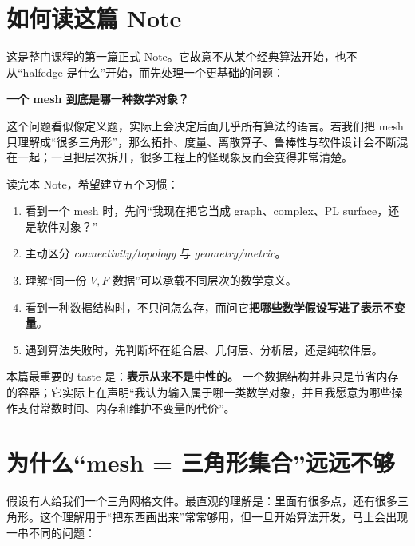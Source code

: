 \documentclass[UTF8,11pt]{ctexart}
\title{\notetitle}
\author{Mesh 深度学习课程 · M00-N01}
\date{版本 \noteversion\quad 状态：\notestatus\quad 更新：\notelastupdate}
\begin{document}
\maketitle
\tableofcontents

\section*{如何读这篇 Note}

这是整门课程的第一篇正式 Note。它故意不从某个经典算法开始，也不从“halfedge 是什么”开始，而先处理一个更基础的问题：

\begin{center}
\Large\bfseries 一个 mesh 到底是哪一种数学对象？
\end{center}

这个问题看似像定义题，实际上会决定后面几乎所有算法的语言。若我们把 mesh 只理解成“很多三角形”，那么拓扑、度量、离散算子、鲁棒性与软件设计会不断混在一起；一旦把层次拆开，很多工程上的怪现象反而会变得非常清楚。

读完本 Note，希望建立五个习惯：

\begin{enumerate}
  \item 看到一个 mesh 时，先问“我现在把它当成 graph、complex、PL surface，还是软件对象？”
  \item 主动区分 \emph{connectivity/topology} 与 \emph{geometry/metric}。
  \item 理解“同一份 $V,F$ 数据”可以承载不同层次的数学意义。
  \item 看到一种数据结构时，不只问怎么存，而问它\textbf{把哪些数学假设写进了表示不变量}。
  \item 遇到算法失败时，先判断坏在组合层、几何层、分析层，还是纯软件层。
\end{enumerate}

\begin{keyidea}
本篇最重要的 taste 是：\textbf{表示从来不是中性的。} 一个数据结构并非只是节省内存的容器；它实际上在声明“我认为输入属于哪一类数学对象，并且我愿意为哪些操作支付常数时间、内存和维护不变量的代价”。
\end{keyidea}

\section{为什么“mesh = 三角形集合”远远不够}

假设有人给我们一个三角网格文件。最直观的理解是：里面有很多点，还有很多三角形。这个理解用于“把东西画出来”常常够用，但一旦开始算法开发，马上会出现一串不同的问题：
\end{document}
